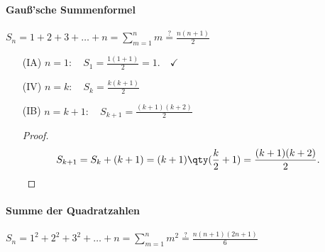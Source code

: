 \paragraph{Gauß'sche Summenformel} $S_n = 1 +2+3+\hdots + n = \sum_{m=1}^n m \overset{?}{=} \frac{n(n+1)}{2}$

\begin{enumerate}
    \item[(IA)] $\displaystyle n=1: \quad S_1 = \frac{1(1+1)}{2} = 1 .\quad\checkmark$ 
    \item[(IV)] $\displaystyle n=k: \quad S_k = \frac{k(k+1)}{2}$
    \item[(IB)] $\displaystyle n=k+1:\quad S_{k+1} = \frac{(k+1)(k+2)}{2}$
    \begin{proof}$~$\\[-1.5cm]
        \begin{align}
            S_{k+1} &= S_k + (k+1) = (k+1)\qty(\frac{k}{2}+1) = \frac{(k+1)(k+2)}{2}.
        \end{align}
    \end{proof}
\end{enumerate}

\paragraph{Summe der Quadratzahlen} $S_n = 1^2 + 2^2 + 3^2+\hdots + n = \sum_{m=1}^n m^2 \overset{?}{=} \frac{n(n+1)(2n+1)}{6}$

